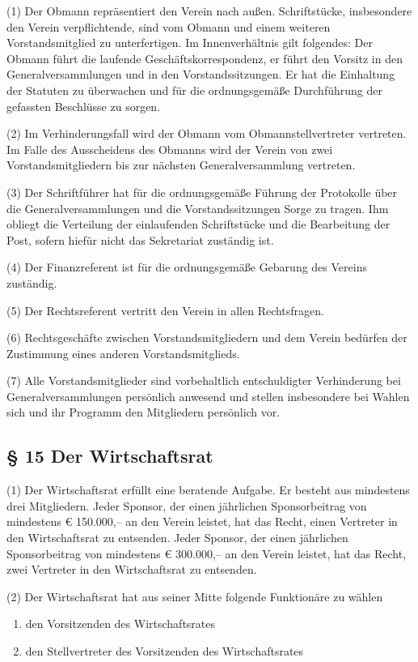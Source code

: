 \documentclass[10pt,a4paper]{article}
\begin{document}
(1)
Der Obmann repräsentiert den Verein nach außen.
Schriftstücke, insbesondere den Verein verpflichtende, sind vom Obmann und einem weiteren Vorstandsmitglied zu unterfertigen.
Im Innenverhältnis gilt folgendes:
Der Obmann führt die laufende Geschäftskorrespondenz, er führt den Vorsitz in den Generalversammlungen und in den Vorstandssitzungen.
Er hat die Einhaltung der Statuten zu überwachen und für die ordnungsgemäße Durchführung der gefassten Beschlüsse zu sorgen.

(2)
Im Verhinderungsfall wird der Obmann vom Obmannstellvertreter vertreten.
Im Falle des Ausscheidens des Obmanns wird der Verein von zwei Vorstandsmitgliedern bis zur nächsten Generalversammlung vertreten.

(3)
Der Schriftführer hat für die ordnungsgemäße Führung der Protokolle über die Generalversammlungen und die Vorstandssitzungen Sorge zu tragen.
Ihm obliegt die Verteilung der einlaufenden Schriftstücke und die Bearbeitung der Post, sofern hiefür nicht das Sekretariat zuständig ist.

(4)
Der Finanzreferent ist für die ordnungsgemäße Gebarung des Vereins zuständig.

(5)
Der Rechtsreferent vertritt den Verein in allen Rechtsfragen.

(6)
Rechtsgeschäfte zwischen Vorstandsmitgliedern und dem Verein bedürfen der Zustimmung eines anderen Vorstandsmitglieds.

(7)
Alle Vorstandsmitglieder sind vorbehaltlich entschuldigter Verhinderung bei Generalversammlungen persönlich anwesend und stellen insbesondere bei Wahlen sich und ihr Programm den Mitgliedern persönlich vor.

\subsection{§ 15
Der Wirtschaftsrat}

(1)
Der Wirtschaftsrat erfüllt eine beratende Aufgabe.
Er besteht aus mindestens drei Mitgliedern.
Jeder Sponsor, der einen jährlichen Sponsorbeitrag von mindestens € 150.000,-- an den Verein leistet, hat das Recht, einen Vertreter in den Wirtschaftsrat zu entsenden.
Jeder Sponsor, der einen jährlichen Sponsorbeitrag von mindestens € 300.000,-- an den Verein leistet, hat das Recht, zwei Vertreter in den Wirtschaftsrat zu entsenden.

(2)
Der Wirtschaftsrat hat aus seiner Mitte folgende Funktionäre zu wählen

\begin{enumerate}[label=\alph*)]
\item
den Vorsitzenden des Wirtschaftsrates
\item
den Stellvertreter des Vorsitzenden des Wirtschaftsrates
\end{enumerate}
\end{document}
